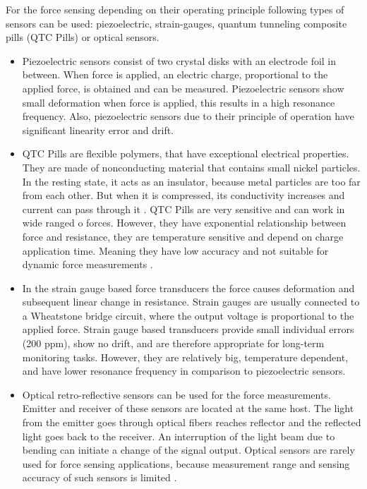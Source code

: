 For the force sensing depending on their operating principle following types of sensors can be used: piezoelectric, strain-gauges, quantum tunneling composite pills (QTC Pills) or optical sensors. \cite{SGandP1}

\begin{itemize}
\item Piezoelectric sensors consist of two crystal disks with an electrode foil in between. When force is applied, an electric charge, proportional to the applied force, is obtained and can be measured. Piezoelectric sensors show small deformation when force is applied, this results in a high resonance frequency. Also, piezoelectric sensors due to their principle of operation have significant linearity error and drift. \cite{SGandP2}

\item QTC Pills are flexible polymers, that have exceptional electrical properties. They are made of nonconducting material that contains small nickel particles.  In the resting state, it acts as an insulator, because metal particles are too far from each other. But when it is compressed, its conductivity increases and current can pass through it \cite{azaman_characteristic_2016}. QTC Pills are very sensitive and can work in wide ranged o forces. However, they have exponential relationship between force and resistance, they are temperature sensitive and depend on charge application time. Meaning they have low accuracy and not suitable for dynamic force measurements \cite{_quantum_2010}.

\item In the strain gauge based force transducers the force causes deformation and subsequent linear change in resistance. Strain gauges are usually connected to a Wheatstone bridge circuit, where the output voltage is proportional to the applied force. Strain gauge based transducers provide small individual errors (200 ppm), show no drift, and are therefore appropriate for long-term monitoring tasks. However, they are relatively big, temperature dependent, and have lower resonance frequency in comparison to piezoelectric sensors. \cite{SGandP1,SGandP2}

\item Optical retro-reflective sensors can be used for the force measurements. Emitter and receiver of these sensors are located at the same host. The light from the emitter goes through optical fibers reaches reflector and the reflected light goes back to the receiver. An interruption of the light beam due to bending can initiate a change of the signal output. Optical sensors are rarely used for force sensing applications, because measurement range and sensing accuracy of such sensors is limited \cite{su_fiber_optic_2017}.
\end{itemize}

